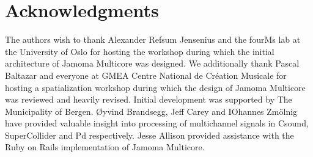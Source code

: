 \documentclass[twoside,a4paper]{article}
\begin{document}





%
\section{Acknowledgments} %
%

The authors wish to thank Alexander Refsum Jensenius and the fourMs lab at the University of Oslo for hosting the workshop during which the initial architecture of Jamoma Multicore was designed. 
We additionally thank Pascal Baltazar and everyone at GMEA Centre National de Cr\' eation Musicale for hosting a spatialization workshop during which the design of Jamoma Multicore was reviewed and heavily revised.
Initial development was supported by The Municipality of Bergen.  
\O yvind Brandsegg, Jeff Carey and IOhannes Zm\"olnig have provided valuable insight into processing of multichannel signals in Csound, SuperCollider and Pd respectively.
Jesse Allison provided assistance with the Ruby on Rails implementation of Jamoma Multicore.





\end{document}
